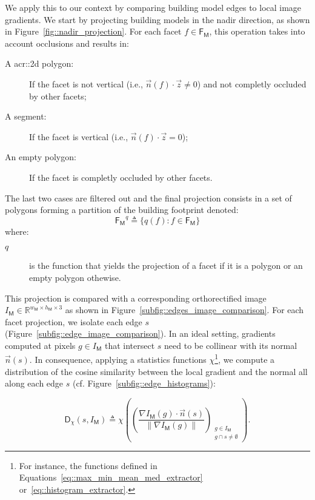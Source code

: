         We apply this to our context by comparing building model edges to local image gradients.
        We start by projecting building models in the nadir direction, as shown in Figure~\ref{fig::nadir_projection}.
        For each facet \(f \in \mathsf{F_M}\), this operation takes into account occlusions and results in:
        \begin{description}
            \item[A \gls{acr::2d} polygon:] If the facet is not vertical (i.e., \(\vec{n}(f) \cdot \vec{z} \neq 0\)) and not completly occluded by other facets;
            \item[A segment:] If the facet is vertical (i.e., \(\vec{n}(f) \cdot \vec{z} = 0\));
            \item[An empty polygon:] If the facet is completly occluded by other facets.
        \end{description}
        The last two cases are filtered out and the final projection consists in a set of polygons forming a partition of the building footprint denoted:
        \begin{equation}
            \label{eq::facet_projections}
            \mathsf{F_M}^q \triangleq \{q(f): f \in \mathsf{F_M}\}
        \end{equation}
        where:
        \begin{description}
            \item[\(q\)] is the function that yields the projection of a facet if it is a polygon or an empty polygon othewise.
        \end{description}

        This projection is compared with a corresponding orthorectified image \(I_{\mathsf{M}} \in \mathbb{R}^{w_{\mathsf{M}} \times h_{\mathsf{M}} \times 3}\) as shown in Figure~\ref{subfig::edges_image_comparison}.
        For each facet projection, we isolate each edge \(s\) (Figure~\ref{subfig::edge_image_comparison}).
        In an ideal setting, gradients computed at pixels $g \in I_{\mathsf{M}}$ that intersect \(s\) need to be collinear with its normal $\vec{n}(s)$.
        In consequence, applying a statistics functions $\chi$\footnote{
            For instance, the functions defined in Equations~\ref{eq::max_min_mean_med_extractor} or~\ref{eq::histogram_extractor}.
        }, we compute a distribution of the cosine similarity between the local gradient and the normal all along each edge \(s\) (cf. Figure~\ref{subfig::edge_histograms}):
        
        \begin{equation}
            \label{eq::corr_seg}
            \mathsf{D}_{\chi}(s, I_{\mathsf{M}}) \triangleq \chi \left( \left(\frac{\nabla I_{\mathsf{M}}\left(g\right) \cdot \vec{n}(s)}{\left\rVert \nabla I_{\mathsf{M}}\left(g\right)\right\rVert}\right)_{\substack{g \in I_{\mathsf{M}} \\ g \cap s \neq \emptyset}} \right).
        \end{equation}

